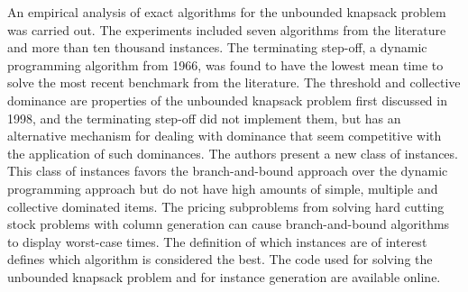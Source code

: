 An empirical analysis of exact algorithms for the unbounded knapsack problem was carried out.
The experiments included seven algorithms from the literature and more than ten thousand instances.
The terminating step-off, a dynamic programming algorithm from 1966, was found to have the lowest mean time to solve the most recent benchmark from the literature.
The threshold and collective dominance are properties of the unbounded knapsack problem first discussed in 1998, and the terminating step-off did not implement them, but has an alternative mechanism for dealing with dominance that seem competitive with the application of such dominances.
The authors present a new class of instances.
This class of instances favors the branch-and-bound approach over the dynamic programming approach but do not have high amounts of simple, multiple and collective dominated items.
The pricing subproblems from solving hard cutting stock problems with column generation can cause branch-and-bound algorithms to display worst-case times. %
The definition of which instances are of interest defines which algorithm is considered the best.
The code used for solving the unbounded knapsack problem and for instance generation are available online.

